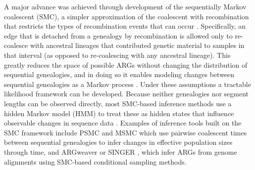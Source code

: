 \documentclass[11pt]{article}
\begin{document}
A major advance was achieved through development of the sequentially Markov 
coalescent (SMC), a simpler approximation of the coalescent with recombination
that restricts the types of recombination events that can occur 
\citep{mcvean2005approximating}. Specifically,
an edge that is detached from a genealogy by recombination is allowed only to
re-coalesce with ancestral lineages that contributed genetic material to samples
in that interval (as opposed to re-coalescing with any ancestral lineage). 
This greatly reduces the space of possible ARGs without changing the
distribution of sequential genealogies, and in doing so it enables modeling
changes between sequential genealogies
as a Markov process \citep{mcvean2005approximating}. 
Under these assumptions a tractable likelihood framework can be developed. 
Because neither genealogies nor segment lengths can
be observed directly, most SMC-based inference methods use 
a hidden Markov model (HMM) to treat these as hidden states 
that influence observable changes in sequence data \citep{spence_inference_2018}.
Examples of inference tools built on the SMC framework include 
PSMC \citep{li2011inference} and MSMC \citep{schiffels_inferring_2014}
which use pairwise coalescent times between sequential genealogies
to infer changes in effective population sizes through time, 
and ARGweaver \citep{rasmussen2014genome, hubisz2020inference} 
or SINGER \citep{deng_robust_2024},
which infer ARGs from genome alignments using SMC-based conditional sampling methods.
\end{document}
